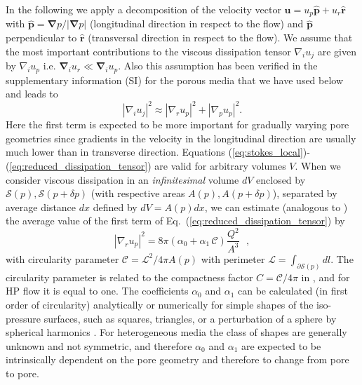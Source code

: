\documentclass[draft]{agujournal2019}
\begin{document}
In the following we apply a decomposition of the velocity vector $\mathbf{u} = u_p \mathbf{\hat{p}} + u_r \mathbf{\hat{r}}$ with $\mathbf{\hat{p}} =\mathbf{ \nabla}p/|\mathbf{ \nabla}p|$ (longitudinal direction in respect to the flow) and $\hat{\mathbf{p}}$ perpendicular to $\hat{\mathbf{r}}$ (transversal direction in respect to the flow). We assume that the most important contributions to the viscous dissipation tensor $\nabla_i u_j$ are given by $\nabla_i u_p$ i.e. $\mathbf{\nabla}_i u_r \ll \mathbf{\nabla}_i u_p $. Also this assumption has been verified in the supplementary information (SI) for the porous media that we have used below and leads to 
\begin{equation}
\left|\nabla_i u_j\right|^2 \approx  \left|\nabla_r u_p\right|^2 + \left|\nabla_p u_p\right|^2 .\label{eq:reduced_dissipation_tensor}
\end{equation}
Here the first term is expected to be more important for gradually varying pore geometries since gradients in the velocity in the longitudinal direction are usually much lower than in transverse direction. Equations (\ref{eq:stokes_local})-(\ref{eq:reduced_dissipation_tensor}) are valid for arbitrary volumes $V$. When we consider viscous dissipation in an \textit{infinitesimal} volume $dV$ enclosed by $\mathcal{S}(p),\mathcal{S}(p+\delta p)$ (with respective areas $A(p), A(p+\delta p)$), separated by average distance $dx$ defined by $dV = A(p)dx$, we can estimate (analogous to ) the average value of the first term of Eq.~(\ref{eq:reduced_dissipation_tensor}) by
\begin{equation}
	\left|\nabla_r u_p\right|^2 =8\pi \left(\alpha_0+\alpha_1\,\mathcal{C}\right)\frac{ Q^2}{A^3}~~~ ,\label{eq:tau_1}
\end{equation}
with circularity parameter $\mathcal{C} = \mathcal{L}^2/4\pi A(p)$ with perimeter $\mathcal{L} = \int_{\partial \mathcal{S}(p)}dl$. The circularity parameter is related to the compactness factor $C = \mathcal{C}/4\pi$ in \cite{mortensen_reexamination_2005}, and for HP flow it is equal to one. The coefficients $\alpha_0$ and $\alpha_1$ can be calculated (in first order of circularity) analytically or numerically for simple shapes of the iso-pressure surfaces, such as squares, triangles, or a perturbation of a sphere by spherical harmonics \cite{mortensen_reexamination_2005}. For heterogeneous media the class of shapes are generally unknown and not symmetric, and therefore $\alpha_0$ and $\alpha_1$ are expected to be intrinsically dependent on the pore geometry and therefore to change from pore to pore.  
\end{document}
